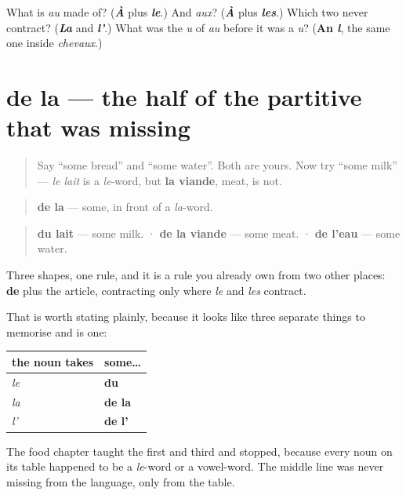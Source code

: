 \begin{tcolorbox}[breakable,colback=teal!4,colframe=teal!35!black,title={Before you move on}]
What is \emph{au} made of? (\emph{\textbf{À}} plus \emph{\textbf{le}}.) And \emph{aux}? (\emph{\textbf{À}} plus \emph{\textbf{les}}.) Which two never contract? (\emph{\textbf{La}} and \emph{\textbf{l'}}.) What was the \emph{u} of \emph{au} before it was a \emph{u}? (\textbf{An \emph{l}}, the same one inside \emph{chevaux}.)
\end{tcolorbox}
\section[de la]{de la — the half of the partitive that was missing}

\label{lesson:FR-C35-de-la}



\begin{quote}
Say \textquotedblleft{}some bread\textquotedblright{} and \textquotedblleft{}some water\textquotedblright{}. Both are yours. Now try \textquotedblleft{}some milk\textquotedblright{} — \emph{le lait} is a \emph{le}-word, but \textbf{la viande}, meat, is not.
\end{quote}

\begin{cousinweb}
\begin{quote}
\textbf{de la} — some, in front of a \emph{la}-word.
\end{quote}

\begin{quote}
\textbf{du lait} — some milk. · \textbf{de la viande} — some meat. · \textbf{de l'eau} — some water.
\end{quote}

Three shapes, one rule, and it is a rule you already own from two other places: \textbf{de} plus the article, contracting only where \emph{le} and \emph{les} contract.

That is worth stating plainly, because it looks like three separate things to memorise and is one:

\noindent
\begin{tabularx}{\linewidth}{@{}>{\raggedright\arraybackslash}X>{\raggedright\arraybackslash}X@{}}
\toprule
\textbf{the noun takes} & \textbf{some…} \\
\midrule
\emph{le} & \textbf{du} \\
\emph{la} & \textbf{de la} \\
\emph{l'} & \textbf{de l'} \\
\bottomrule
\end{tabularx}

The food chapter taught the first and third and stopped, because every noun on its table happened to be a \emph{le}-word or a vowel-word. The middle line was never missing from the language, only from the table.
\end{cousinweb}

